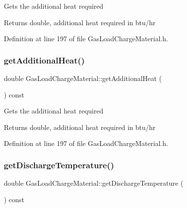 Gets the additional heat required \begin{DoxyReturn}{Returns}
double, additional heat required in btu/hr 
\end{DoxyReturn}


Definition at line 197 of file Gas\+Load\+Charge\+Material.\+h.

\mbox{\label{class_gas_load_charge_material_a5c01f171b61c01c93db6453cb122e1ba}} 
\subsubsection{\texorpdfstring{get\+Additional\+Heat()}{getAdditionalHeat()}\hspace{0.1cm}{\footnotesize\ttfamily [3/3]}}
{\footnotesize\ttfamily double Gas\+Load\+Charge\+Material\+::get\+Additional\+Heat (\begin{DoxyParamCaption}{ }\end{DoxyParamCaption}) const\hspace{0.3cm}{\ttfamily [inline]}}

Gets the additional heat required \begin{DoxyReturn}{Returns}
double, additional heat required in btu/hr 
\end{DoxyReturn}


Definition at line 197 of file Gas\+Load\+Charge\+Material.\+h.

\mbox{\label{class_gas_load_charge_material_a6baaf6ad65e2a3d1fa90b7c007bc3c53}} 
\subsubsection{\texorpdfstring{get\+Discharge\+Temperature()}{getDischargeTemperature()}\hspace{0.1cm}{\footnotesize\ttfamily [1/3]}}
{\footnotesize\ttfamily double Gas\+Load\+Charge\+Material\+::get\+Discharge\+Temperature (\begin{DoxyParamCaption}{ }\end{DoxyParamCaption}) const\hspace{0.3cm}{\ttfamily [inline]}}


